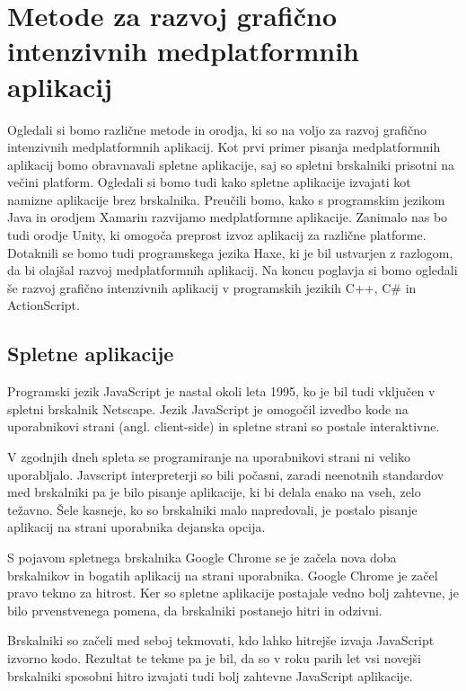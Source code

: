 \chapter{Metode za razvoj grafično intenzivnih medplatformnih aplikacij}

Ogledali si bomo različne metode in orodja, ki so na voljo za razvoj grafično intenzivnih medplatformnih aplikacij. Kot prvi primer pisanja medplatformnih aplikacij bomo obravnavali spletne aplikacije, saj so spletni brskalniki prisotni na večini platform. Ogledali si bomo tudi kako spletne aplikacije izvajati kot namizne aplikacije brez brskalnika. Preučili bomo, kako s programskim jezikom Java in orodjem Xamarin razvijamo medplatformne aplikacije. Zanimalo nas bo tudi orodje Unity, ki omogoča preprost izvoz aplikacij za različne platforme. Dotaknili se bomo tudi programskega jezika Haxe, ki je bil ustvarjen z razlogom, da bi olajšal razvoj medplatformnih aplikacij. Na koncu poglavja si bomo ogledali še razvoj grafično intenzivnih aplikacij v programskih jezikih C++, C\# in ActionScript.

\section{Spletne aplikacije}
\label{sec:web}
Programski jezik JavaScript je nastal okoli leta 1995, ko je bil tudi vključen v spletni brskalnik Netscape. Jezik JavaScript je omogočil izvedbo kode na uporabnikovi strani (angl. client-side) in spletne strani so postale interaktivne.

V zgodnjih dneh spleta se programiranje na uporabnikovi strani ni veliko uporabljalo. Javscript interpreterji so bili počasni, zaradi neenotnih standardov med brskalniki pa je bilo pisanje aplikacije, ki bi delala enako na vseh, zelo težavno. Šele kasneje, ko so brskalniki malo napredovali, je postalo pisanje aplikacij na strani uporabnika dejanska opcija.

S pojavom spletnega brskalnika Google Chrome se je začela nova doba brskalnikov in bogatih aplikacij na strani uporabnika. Google Chrome je začel pravo tekmo za hitrost. Ker so spletne aplikacije postajale vedno bolj zahtevne, je bilo prvenstvenega pomena, da brskalniki postanejo hitri in odzivni.

Brskalniki so začeli med seboj tekmovati, kdo lahko hitrejše izvaja JavaScript izvorno kodo. Rezultat te tekme pa je bil, da so v roku parih let vsi novejši brskalniki sposobni hitro izvajati tudi bolj zahtevne JavaScript aplikacije. 

